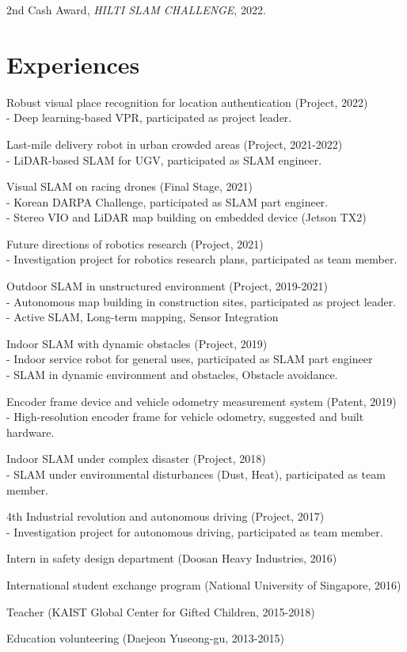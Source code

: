 \documentclass[margin]{res}
\begin{document}
\begin{resume}
		\par 2nd Cash Award, \textit{HILTI SLAM CHALLENGE}, 2022.

		\section{Experiences}
		
		\par	Robust visual place recognition for location authentication (Project, 2022) 
		\\-	Deep learning-based VPR, participated as project leader.
		\par	Last-mile delivery robot in urban crowded areas (Project, 2021-2022) 
		\\-	LiDAR-based SLAM for UGV, participated as SLAM engineer.
		\par	Visual SLAM on racing drones (Final Stage, 2021)
		\\-	Korean DARPA Challenge, participated as SLAM part engineer.
		\\-	Stereo VIO and LiDAR map building on embedded device (Jetson TX2)
		\par	Future directions of robotics research (Project, 2021)
		\\-	Investigation project for robotics research plans, participated as team member.
		\par	Outdoor SLAM in unstructured environment (Project, 2019-2021)
		\\-	Autonomous map building in construction sites, participated as project leader.
		\\-	Active SLAM, Long-term mapping, Sensor Integration
		\par	Indoor SLAM with dynamic obstacles (Project, 2019)
		\\-	Indoor service robot for general uses, participated as SLAM part engineer
		\\-	SLAM in dynamic environment and obstacles, Obstacle avoidance.
		\par	Encoder frame device and vehicle odometry measurement system (Patent, 2019)
		\\-	High-resolution encoder frame for vehicle odometry, suggested and built hardware.
		\par	Indoor SLAM under complex disaster (Project, 2018)
		\\-	SLAM under environmental disturbances (Dust, Heat), participated as team member.
		\par	4th Industrial revolution and autonomous driving (Project, 2017)
		\\-	Investigation project for autonomous driving, participated as team member.
		\par	Intern in safety design department (Doosan Heavy Industries, 2016)
		\par	International student exchange program (National University of Singapore, 2016)
		\par	Teacher (KAIST Global Center for Gifted Children, 2015-2018)
		\par	Education volunteering (Daejeon Yuseong-gu, 2013-2015)
		

\end{resume}
\end{document}
